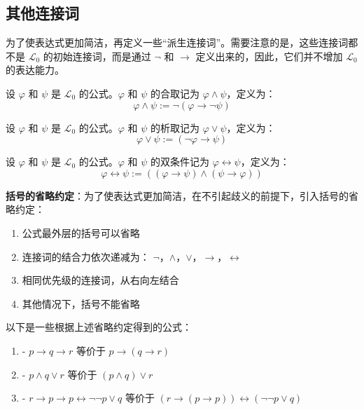 \subsection{其他连接词}
\label{other_connectives}

为了使表达式更加简洁，再定义一些“派生连接词”。需要注意的是，这些连接词都不是 $\mathcal{L}_0$ 的初始连接词，而是通过 $\neg$ 和 $\to$ 定义出来的，因此，它们并不增加 $\mathcal{L}_0$ 的表达能力。

\begin{definition}[合取 Conjunction]
    \label{conjunction_of_L0}
    设 $\varphi$ 和 $\psi$ 是 $\mathcal{L}_0$ 的公式。$\varphi$ 和 $\psi$ 的合取记为 $\varphi \wedge \psi$，定义为：
    \[
        \varphi \wedge \psi := \neg (\varphi \to \neg \psi)
    \]
\end{definition}

\begin{definition}[析取 Disjunction]
    \label{disjunction_of_L0}
    设 $\varphi$ 和 $\psi$ 是 $\mathcal{L}_0$ 的公式。$\varphi$ 和 $\psi$ 的析取记为 $\varphi \vee \psi$，定义为：
    \[
        \varphi \vee \psi := (\neg \varphi \to \psi)
    \]
\end{definition}

\begin{definition}
    \label{biconditional_of_L0}
    设 $\varphi$ 和 $\psi$ 是 $\mathcal{L}_0$ 的公式。$\varphi$ 和 $\psi$ 的双条件记为 $\varphi \leftrightarrow \psi$，定义为：
    \[
        \varphi \leftrightarrow \psi := ((\varphi \to \psi) \wedge (\psi \to \varphi))
    \]
\end{definition}

\vspace{1em}
\textbf{括号的省略约定}：为了使表达式更加简洁，在不引起歧义的前提下，引入括号的省略约定：
\begin{enumerate}
    \item 公式最外层的括号可以省略
    \item 连接词的结合力依次递减为： $\neg$，$\wedge$，$\vee$，$\to$，$\leftrightarrow$
    \item 相同优先级的连接词，从右向左结合
    \item 其他情况下，括号不能省略
\end{enumerate}
\vspace{1em}

\begin{example}
    以下是一些根据上述省略约定得到的公式：
    \begin{enumerate}
        \item - $p\to q \to r$ 等价于 $p\to (q \to r)$
        \item - $p\wedge q \vee r$ 等价于 $(p\wedge q) \vee r$
        \item - $r\to p \to p \leftrightarrow \neg \neg p \vee q$ 等价于 $(r\to (p \to p)) \leftrightarrow (\neg \neg p \vee q)$
    \end{enumerate}
\end{example}